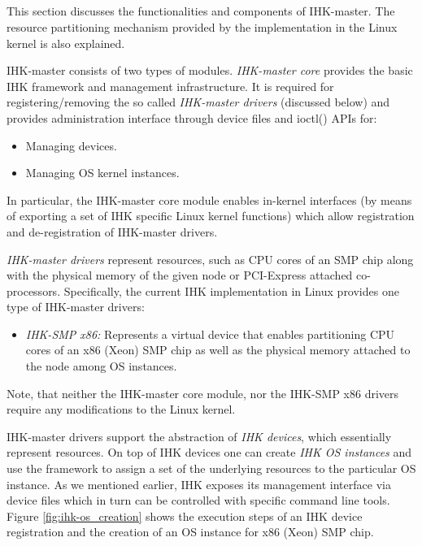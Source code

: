 \documentclass[twoside,11pt,fleqn]{book}
\begin{document}
\subsection{}
\label{sec:lwk_management}

This section discusses the functionalities and components of IHK-master.
The resource partitioning mechanism
provided by the implementation in the Linux kernel is also explained.

IHK-master consists of two types of modules. \textit{IHK-master core} provides
the basic IHK framework and management infrastructure.
It is required for registering/removing the so called \textit{IHK-master drivers}
(discussed below) and provides administration interface
through device files and ioctl() APIs for:

\begin{itemize}
\item Managing devices.
\item Managing OS kernel instances.
\end{itemize}

In particular, the IHK-master core module enables in-kernel interfaces
(by means of exporting a set of IHK specific Linux kernel functions)
which allow registration and de-registration of IHK-master drivers.

\textit{IHK-master drivers} represent resources, such as CPU cores of
an SMP chip along with the physical memory of the given node or
PCI-Express attached co-processors.
Specifically, the current IHK implementation in Linux provides one
type of IHK-master drivers:

\begin{itemize}

\item \textit{IHK-SMP x86:} Represents a virtual device that enables
partitioning CPU cores of an x86 (Xeon) SMP chip as well as the physical
memory attached to the node among OS instances.
\end{itemize}

Note, that neither the IHK-master core module, nor the IHK-SMP x86
drivers require any modifications to the Linux kernel.

IHK-master drivers support the abstraction of \textit{IHK devices}, which
essentially represent resources. On top of IHK devices one can create
\textit{IHK OS instances} and use the framework to assign a set of
the underlying resources to the particular OS instance.
As we mentioned earlier, IHK exposes its management interface via device
files which in turn can be controlled with specific command line tools.
Figure \ref{fig:ihk-os_creation} shows the execution steps of an IHK device registration and the creation of an OS instance for x86 (Xeon) SMP chip.
\end{document}
